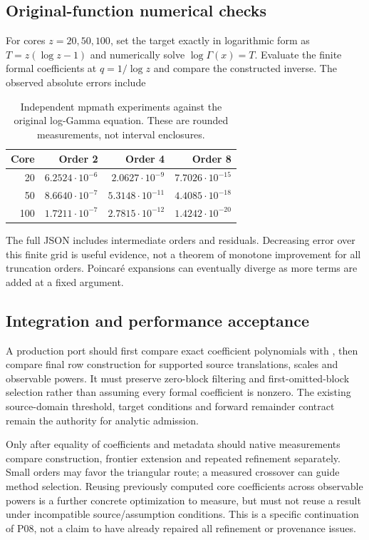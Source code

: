 \documentclass[11pt,letterpaper]{article}
\newcommand{\code}[1]{\texttt{\detokenize{#1}}}
\begin{document}
\subsection{Original-function numerical checks}
For cores $z=20,50,100$, set the target exactly in logarithmic form as $T=z(\log z-1)$ and numerically solve $\log\Gamma(x)=T$. Evaluate the finite formal coefficients at $q=1/\log z$ and compare the constructed inverse. The observed absolute errors include
\begin{table}[htbp]\centering\small
\begin{tabular}{@{}rrrr@{}}\toprule
Core & Order 2 & Order 4 & Order 8\\\midrule
20 & $6.2524\cdot10^{-6}$ & $2.0627\cdot10^{-9}$ & $7.7026\cdot10^{-15}$\\
50 & $8.6640\cdot10^{-7}$ & $5.3148\cdot10^{-11}$ & $4.4085\cdot10^{-18}$\\
100 & $1.7211\cdot10^{-7}$ & $2.7815\cdot10^{-12}$ & $1.4242\cdot10^{-20}$\\\bottomrule
\end{tabular}
\caption{Independent mpmath experiments against the original log-Gamma equation. These are rounded measurements, not interval enclosures.}
\end{table}
The full JSON includes intermediate orders and residuals. Decreasing error over this finite grid is useful evidence, not a theorem of monotone improvement for all truncation orders. Poincar\'e expansions can eventually diverge as more terms are added at a fixed argument.

\subsection{Integration and performance acceptance}
A production port should first compare exact coefficient polynomials with \code{gammaInverseUnit}, then compare final row construction for supported source translations, scales and observable powers. It must preserve zero-block filtering and first-omitted-block selection rather than assuming every formal coefficient is nonzero. The existing source-domain threshold, target conditions and forward remainder contract remain the authority for analytic admission.\cite{gamma}

Only after equality of coefficients and metadata should native measurements compare construction, frontier extension and repeated refinement separately. Small orders may favor the triangular route; a measured crossover can guide method selection. Reusing previously computed core coefficients across observable powers is a further concrete optimization to measure, but must not reuse a result under incompatible source/assumption conditions. This is a specific continuation of P08, not a claim to have already repaired all refinement or provenance issues.
\end{document}
